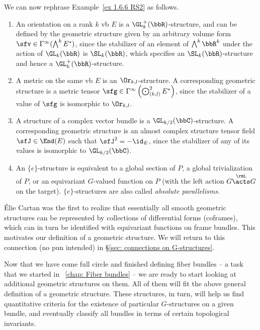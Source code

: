 \begin{example}
    We can now rephrase Example~\ref{ex 1.6.6 RS2} as follows. 
    \begin{enumerate}
        \item An orientation on a rank $k$ \gls{vb} $E$ is a $\GL_k^+(\bbR)$-structure, and can be defined by the geometric structure given by an arbitrary volume form $\sfv\in \Gamma^\infty(\bigwedge^k E^\ast)$, since the stabilizer of an element of $\bigwedge^k \bbR^k$ under the action of $\GL_k(\bbR)$ is $\SL_k(\bbR)$, which specifies an $\SL_k(\bbR)$-structure and hence a $\GL_k^+(\bbR)$-structure.
        \item A metric on the same \gls{vb} $E$ is an $\Or_{k,l}$-structure. A corresponding geometric structure is a metric tensor $\sfg\in \Gamma^\infty\left(\bigodot_{(k,l)}^2 E^\ast\right)$, since the stabilizer of a value of $\sfg$ is isomorphic to $\Or_{k,l}$. 
        \item A structure of a complex vector bundle is a $\GL_{k/2}(\bbC)$-structure. A corresponding geometric structure is an almost complex structure tensor field $\sfJ\in \End(E)$ such that $\sfJ^2=-\id_E$, since the stabilizer of any of its values is isomorphic to $\GL_{k/2}(\bbC)$.
        \item An $\{e\}$-structure is equivalent to a global section of $P$, a global trivialization of $P$, or an equivariant $G$-valued function on $P$ (with the left action $G\overset{\rmL}{\acts}G$ on the target). $\{e\}$-structures are also called \emph{absolute parallelisms}.
    \end{enumerate}
    \'Elie Cartan was the first to realize that essentially all smooth geometric structures can be represented by collections of differential forms (coframes), which can in turn be identified with equivariant functions on frame bundles. This motivates our definition of a geometric structure. We will return to this connection (no pun intended) in \S\ref{sec: connections on G-structures}.
\end{example}

Now that we have come full circle and finished defining fiber bundles -- a task that we started in \Chap~\ref{chap: Fiber bundles} -- we are ready to start looking at additional geometric structures on them. All of them will fit the above general definition of a geometric structure. These structures, in turn, will help us find quantitative criteria for the existence of particular $G$-structures on a given bundle, and eventually classify all bundles in terms of certain topological invariants.